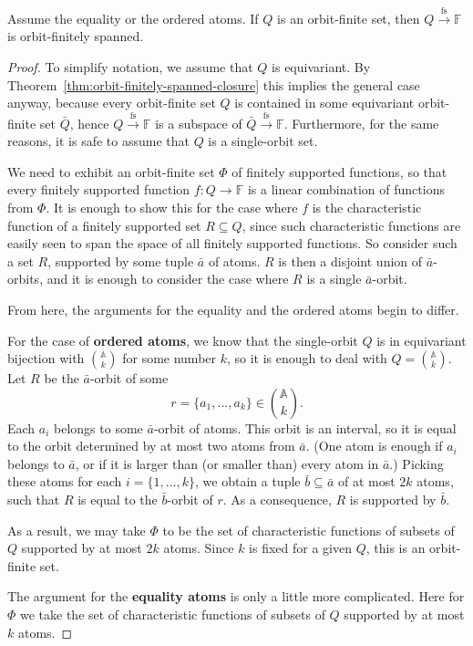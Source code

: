 \documentclass[10pt,a4paper]{amsart}
\numberwithin{equation}{section}
\newcommand{\atoms}{\mathbb A}
\newcommand{\field}{\mathbb F}
\newcommand{\finsup}{\stackrel{\mathrm{fs}}{\to}}
\newcommand{\forms}[1]{#1 \finsup \field}
\begin{document}
\begin{theorem}\label{thm:forms-orbit-finite} Assume the equality or the ordered atoms. If $Q$ is an orbit-finite set, then  $\forms Q$ is   orbit-finitely spanned.
\end{theorem}
\begin{proof}
To simplify notation, we assume that $Q$ is equivariant. By Theorem~\ref{thm:orbit-finitely-spanned-closure} this implies the general case anyway, because every orbit-finite set $Q$ is contained in some equivariant orbit-finite set $\bar{Q}$, hence $\forms Q$ is a subspace of $\forms {\bar{Q}}$. Furthermore, for the same reasons, it is safe to assume that $Q$ is a single-orbit set.

We need to exhibit an orbit-finite set $\Phi$ of finitely supported functions, so that every finitely supported function $f:Q\to\field$ is a linear combination of functions from $\Phi$. It is enough to show this for the case where $f$ is the characteristic function of a finitely supported set $R\subseteq Q$, since such characteristic functions are easily seen to span the space of all finitely supported functions. So consider such a set $R$, supported by some tuple $\bar a$ of atoms. $R$ is then a disjoint union of $\bar a$-orbits, and it is enough to consider the case where $R$ is a single $\bar a$-orbit.

From here, the arguments for the equality and the ordered atoms begin to differ.

For the case of {\bf ordered atoms}, we know that the single-orbit $Q$ is in equivariant bijection with $\atoms\choose k$ for some number $k$, so it is enough to deal with $Q={\atoms\choose k}$. Let $R$ be the $\bar a$-orbit of some 
\[
	\textstyle r = \{a_1,\ldots,a_k\}\in{\atoms\choose k}.
\]
Each $a_i$ belongs to some $\bar a$-orbit of atoms. This orbit is an interval, so it is equal to the orbit determined by at most two atoms from $\bar a$. (One atom is enough if $a_i$ belongs to $\bar a$, or if it is larger than (or smaller than) every atom in $\bar a$.) Picking these atoms for each $i=\{1,\ldots, k\}$, we obtain a tuple $\bar b\subseteq \bar a$ of at most $2k$ atoms, such that $R$ is equal to the $\bar b$-orbit of $r$. As a consequence, $R$ is supported by $\bar b$.

As a result, we may take $\Phi$ to be the set of characteristic functions of subsets of $Q$ supported by at most $2k$ atoms. Since $k$ is fixed for a given $Q$, this is an orbit-finite set.

The argument for the {\bf equality atoms} is only a little more complicated. Here for $\Phi$ we take the set of characteristic functions of subsets of $Q$ supported by at most $k$ atoms. 


\end{proof}
\end{document}
